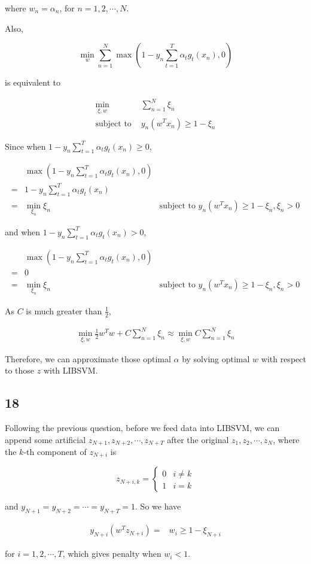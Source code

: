 \documentclass[fleqn,a4paper,12pt]{article}
\begin{document}
where $w_n = \alpha_n$, for $n = 1, 2, \cdots, N$.

Also,

$$\min_{w} \sum_{n=1}^N \max(1 - y_n \sum_{t=1}^T \alpha_t g_t(x_n), 0)$$

is equivalent to

\begin{align*}
  \min_{\xi, w} & \sum_{n=1}^N  \xi_n   \\
  \text{subject to } & y_n (w^T x_n) \geq 1 - \xi_n
\end{align*}

Since when $1 - y_n \sum_{t=1}^T \alpha_t g_t(x_n) \geq 0$,

\begin{align*}
  &  \max(1 - y_n \sum_{t=1}^T \alpha_t g_t(x_n), 0) \\
  =& 1 - y_n \sum_{t=1}^T \alpha_t g_t(x_n) \\
  =& \min_{\xi_n} \xi_n  & \text{subject to } y_n (w^T x_n) \geq 1 - \xi_n, \xi_n > 0
\end{align*}

and when $1 - y_n \sum_{t=1}^T \alpha_t g_t(x_n) > 0$,

\begin{align*}
  &  \max(1 - y_n \sum_{t=1}^T \alpha_t g_t(x_n), 0) \\
  =& 0 \\
  =& \min_{\xi_n} \xi_n  & \text{subject to } y_n (w^T x_n) \geq 1 - \xi_n, \xi_n > 0
\end{align*}

As $C$ is much greater than $\frac{1}{2}$,

\begin{align*}
  \min_{\xi, w} \frac{1}{2} w^T w +  C \sum_{n=1}^N  \xi_n \approx \min_{\xi, w} C \sum_{n=1}^N  \xi_n  
\end{align*}

Therefore, we can approximate those optimal $\alpha$ by solving optimal $w$ with respect to those $z$ with LIBSVM.

\subsection*{18}

Following the previous question, before we feed data into LIBSVM, we can append some artificial $z_{N + 1}, z_{N + 2}, \cdots, z_{N + T}$ after the original $z_1, z_2, \cdots, z_N$, where the $k$-th component of $z_{N + i}$ is

\[
  z_{N + i, k} = 
  \begin{cases}
    0 & i \neq k \\
    1 & i = k
  \end{cases}
\]

and $y_{N + 1} = y_{N + 2} = \cdots = y_{N+T} = 1$. So we have

\begin{align*}
  y_{N + i}(w^T z_{N + i}) =& w_i \geq 1 - \xi_{N + i}
\end{align*}

for $i = 1, 2, \cdots, T$, which gives penalty when $w_i < 1$.
\end{document}
